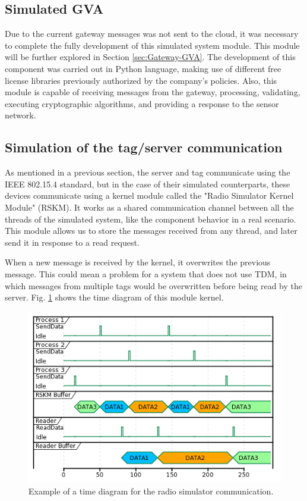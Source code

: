 \documentclass[journal]{IEEEtran}	%
\begin{document}
\subsection{Simulated GVA}


Due to the current gateway messages was not sent to the cloud, it was necessary to complete the fully development of this simulated system module. This module will be further explored in Section \ref{sec:Gateway-GVA}. The development of this component was carried out in Python language, making use of different free license libraries previously authorized by the company's policies. Also, this module is capable of receiving messages from the gateway, processing, validating, executing cryptographic algorithms, and providing a response to the sensor network.


\subsection{Simulation of the tag/server communication}


As mentioned in a previous section, the server and tag communicate using the IEEE 802.15.4 standard, but in the case of their simulated counterparts, these devices communicate using a kernel module called the "Radio Simulator Kernel Module" (RSKM). It works as a shared communication channel between all the threads of the simulated system, like the component behavior in a real scenario. This module allows us to store the messages received from any thread, and later send it in response to a read request.

When a new message is received by the kernel, it overwrites the previous message. This could mean a problem for a system that does not use TDM, in which messages from multiple tags would be overwritten before being read by the server. Fig.  \ref{fig:radio_kernel} shows the time diagram of this module kernel.

\begin{figure}[t!]
\centering
\includegraphics[width=0.98\columnwidth]{radiokernel.png}
\caption{Example of a time diagram for the radio simulator communication.}
\label{fig:radio_kernel}
\end{figure}
\end{document}
